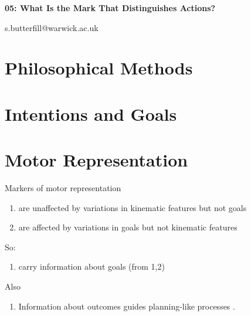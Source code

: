 \documentclass[12pt]{extarticle}
\date{}
\makeatletter
\def \ititle {Philosophical Psychology}
\def \iemail{s.butterfill@warwick.ac.uk}
\makeatother
\begin{document}
\begin{multicols*}{3}

\setlength\footnotesep{1em}











      
\def \ititle {05: What Is the Mark That Distinguishes Actions?}
 
\begin{center}
 
{\Large
 
\textbf{\ititle}
 
}
 
 
 
\iemail %
 
\end{center}
 
 
 
\section{Philosophical Methods}
 
 
 
\section{Intentions and Goals}
 
 
 
\section{Motor Representation}
 
Markers of motor representation 
\begin{enumerate}
\item are unaffected by variations in kinematic features but not goals 
  \citep[e.g.][]{cattaneo:2010_state-dependent,umilta:2008pliers,cattaneo:2009_representation,rochat:2010_responses}
\item are affected by variations in goals but not kinematic features
  \citep[e.g.][]{Fogassi:2005nf,bonini:2010_ventral,cattaneo:2007_impairment,Umilta:2001zr,villiger:2010_activity,koch:2010_resonance}
\end{enumerate}
So:
\begin{enumerate}[resume]
\item carry information about goals (from 1,2)
\end{enumerate}
Also
\begin{enumerate}[resume]
\item Information about outcomes guides planning-like processes
  \citep[consider][]{grafton:2007_evidence,jeannerod:1998nbo,wolpert:1995internal, miall:1996_forward,arbib:1985_coordinated,mason:2001_hand,santello:2002_patterns}.
\end{enumerate}
 

\end{multicols*}
\end{document}
